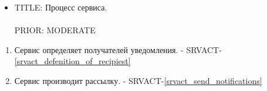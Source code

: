         \begin{itemize}

             \item {
               TITLE: Процесс сервиса.\\
               \\
               PRIOR: MODERATE\\
             }

             \end{itemize}

        \begin{alg} \label{alg_notofocation_service_processing} \mbox{}

             \begin{enumerate}

               \item Сервис определяет получателей уведомления. - SRVACT-\ref{srvact_defenition_of_recipiest}

               \item Сервис производит рассылку. - SRVACT-\ref{srvact_send_notifications}

             \end{enumerate}

             \end{alg}


